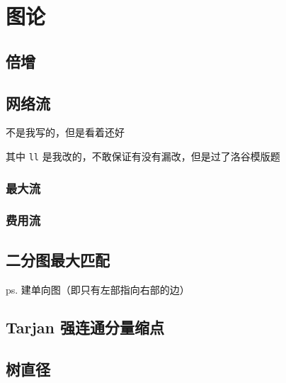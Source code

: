 \documentclass{article}
\begin{document}


\section{图论}

\subsection{倍增}



\subsection{网络流}

不是我写的，但是看着还好

其中 \lstinline{ll} 是我改的，不敢保证有没有漏改，但是过了洛谷模版题

\subsubsection{最大流}



\subsubsection{费用流}



\subsection{二分图最大匹配}

ps. 建单向图（即只有左部指向右部的边）



\subsection{Tarjan 强连通分量缩点}



\subsection{树直径}
\end{document}
